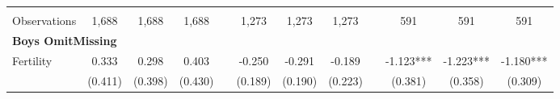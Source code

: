 \begin{landscape}
\begin{table}[htpb!]
\begin{center}
\begin{tabular}{lcccp{2mm}cccp{2mm}ccc}
\begin{footnotesize}\end{footnotesize}&\begin{footnotesize}\end{footnotesize}&\begin{footnotesize}\end{footnotesize}&\begin{footnotesize}\end{footnotesize}&\begin{footnotesize}\end{footnotesize}&\begin{footnotesize}\end{footnotesize}&\begin{footnotesize}\end{footnotesize}&\begin{footnotesize}\end{footnotesize}&\begin{footnotesize}\end{footnotesize}&\begin{footnotesize}\end{footnotesize}&\begin{footnotesize}\end{footnotesize}&\begin{footnotesize}\end{footnotesize}\\Observations&1,688&1,688&1,688&&1,273&1,273&1,273&&591&591&591\\
\multicolumn{12}{l}{\textbf{Boys OmitMissing}}\\ 
Fertility&0.333&0.298&0.403&&-0.250&-0.291&-0.189&&-1.123***&-1.223***&-1.180***\\
&(0.411)&(0.398)&(0.430)&&(0.189)&(0.190)&(0.223)&&(0.381)&(0.358)&(0.309)\\

\end{tabular}
\end{center}
\end{table}
\end{landscape}
